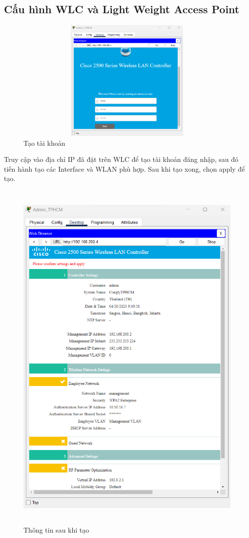 \documentclass[12pt,a4paper]{report}
\begin{document}
\subsection{Cấu hình WLC và Light Weight Access Point }
\begin{figure}[H]
    \centering
    \includegraphics[width=12cm, height=6cm]{img/WLC1.png}
    \caption{Tạo tài khoản }
    \label{hinh46a}
\end{figure}
\hspace*{1cm}Truy cập vào địa chỉ IP đã đặt trên WLC để tạo tài khoản đăng nhập, sau đó tiến hành tạo các Interface và WLAN phù hợp. Sau khi tạo xong, chọn apply để tạo.\\
\begin{figure}[H]
    \centering
    \includegraphics[width=16cm, height=18cm]{img/WLC2.png}
    \caption{Thông tin sau khi tạo}
    \label{hinh45b}
\end{figure}
    
\end{document}
